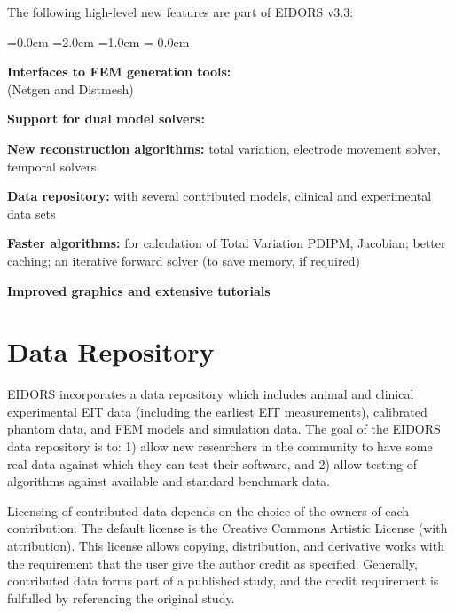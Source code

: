 \documentclass[letterpaper,twocolumn,10pt]{article}
\begin{document}
The following high-level new features are part of EIDORS v3.3:

\begin{list}{\bf {}.}
  {\leftmargin=0.0em \itemindent=2.0em
    \listparindent=1.0em \parsep=-0.0em
    }
\item {\bf Interfaces to FEM generation tools:} \\
(Netgen\cite{schoeberl1997}
and Distmesh\cite{persson2004})

\item {\bf Support for dual model solvers:}

\item {\bf New reconstruction algorithms:}
 total variation, electrode movement solver,
  temporal solvers

\item {\bf Data repository:}
 with several contributed models, clinical
   and experimental data sets

\item {\bf Faster algorithms:} for calculation of
   Total Variation PDIPM, Jacobian; better caching;
   an iterative forward solver (to save memory, if required)

\item {\bf Improved graphics and extensive tutorials}

\end{list}

\section{Data Repository}

EIDORS incorporates a data repository which includes
animal and clinical experimental EIT data
(including the earliest EIT measurements\cite{barber1983}), 
calibrated phantom data, and FEM models and
simulation data. The goal of the EIDORS data
repository is to: 
1) allow new researchers in the community to have some real data against
which they can test their software, and
2) allow testing of algorithms against available and standard benchmark data.

Licensing of contributed data depends on the choice of
the owners of each contribution. The 
default license is the Creative Commons Artistic License
(with attribution). This license allows copying, distribution, and
derivative works with the requirement that the user give the
author credit as specified. 
Generally, contributed data forms part of a published
study, and the credit requirement is fulfulled by 
referencing the original study.
\end{document}
